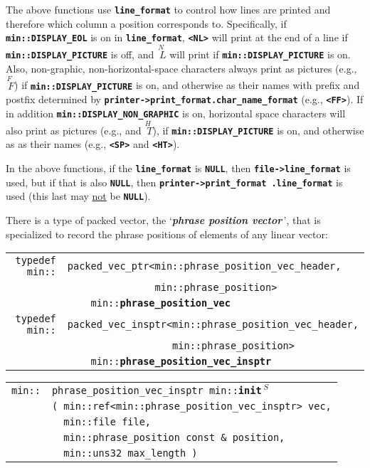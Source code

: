 \documentclass[12pt]{article}
\makeatletter
\newcommand{\TT}[1]{{\tt \bfseries #1}}
\newcommand{\key}[1]{{\bf \em #1}\index{#1}}
\newcommand{\ttindex}[1]{\index{#1@{\tt #1}}}
\newcommand{\EOL}{\penalty \exhyphenpenalty}
\newenvironment{indpar}[1][0.3in]%
	{\begin{list}{}%
		     {\setlength{\itemsep}{0in}%
		      \setlength{\topsep}{0in}%
		      \setlength{\parsep}{1ex}%
		      \setlength{\labelwidth}{#1}%
		      \setlength{\leftmargin}{#1}%
		      \addtolength{\leftmargin}{\labelsep}}%
	 \item}%
	{\end{list}}
\newcommand{\LABEL}[1]{\label{#1}}
\newlength{\ARGBREAKLENGTH}
\newcommand{\ARGBREAK}[1][\ARGBREAKLENGTH]{\\&\hspace*{#1}}
\newcommand{\MINKEY}[1]%
	   {\TT{#1}\ttindex{min::#1}\ttindex{#1}}
\newcommand{\RESIZE}{$\,^S$}
\makeatother
\begin{document}
The above functions use \TT{line\_format}
to control how lines are printed and therefore which column
a position corresponds to.
Specifically, if \TT{min::\EOL DISPLAY\_\EOL EOL}
is on in \TT{line\_format}, \TT{<NL>} 
will print at the end of a line if
\TT{min::\EOL DISPLAY\_\EOL PICTURE} is off, and
{\tiny $\stackrel{\textstyle N~}{~L}$} will print if
\TT{min::\EOL DISPLAY\_\EOL PICTURE} is on.  Also,
non-graphic, non-horizontal-space characters always print as pictures
(e.g., {\tiny $\stackrel{\textstyle F~}{~F}$})
if \TT{min::\EOL DISPLAY\_\EOL PICTURE} is on, and otherwise as
their names with prefix and postfix determined by
\TT{printer->\EOL print\_\EOL format.char\_\EOL name\_\EOL format}
(e.g., \TT{<FF>}).
If in addition \TT{min::\EOL DISPLAY\_\EOL NON\_\EOL GRAPHIC} is on,
horizontal space characters will also print as pictures
(e.g., \TT{\textvisiblespace} and {\tiny $\stackrel{\textstyle H~}{~T}$}),
if \TT{min::\EOL DISPLAY\_\EOL PICTURE} is on, and otherwise as
as their names (e.g., \TT{<SP>} and \TT{<HT>}).

In the above functions, if the \TT{line\_format} is \TT{NULL},
then \TT{file->\EOL line\_\EOL format} is used, but if that is
also \TT{NULL}, then \TT{printer->\EOL print\_\EOL format\EOL
.line\_\EOL format} is used (this last may \underline{not}
be \TT{NULL}).

There is a type of packed vector, the `\key{phrase position vector}\,',
that is specialized to
record the phrase positions of elements of any linear vector:

\begin{indpar}[1em]\begin{tabular}{r@{}l}
\verb|typedef min::|
	& \verb|packed_vec_ptr<min::phrase_position_vec_header,|\\&
	  \verb|               min::phrase_position>|\\&
	  \verb|    min::|\MINKEY{phrase\_position\_vec}
\LABEL{MIN::PHRASE_POSITION_VEC} \\
\verb|typedef min::|
	& \verb|packed_vec_insptr<min::phrase_position_vec_header,|\\&
	  \verb|                  min::phrase_position>|\\&
	  \verb|    min::|\MINKEY{phrase\_position\_vec\_insptr}
\LABEL{MIN::PHRASE_POSITION_VEC_INSPTR} \\
\end{tabular}\end{indpar}

\begin{indpar}[1em]\begin{tabular}{r@{}l}
\verb|min::| 
  & \verb|phrase_position_vec_insptr min::|\MINKEY{init\RESIZE}\ARGBREAK
    \verb|( min::ref<min::phrase_position_vec_insptr> vec,|\ARGBREAK
    \verb|  min::file file,|\ARGBREAK
    \verb|  min::phrase_position const & position,|\ARGBREAK
    \verb|  min::uns32 max_length )|
\LABEL{MIN::INIT_OF_PHRASE_POSITION_VEC} \\
\end{tabular}\end{indpar}
\end{document}
